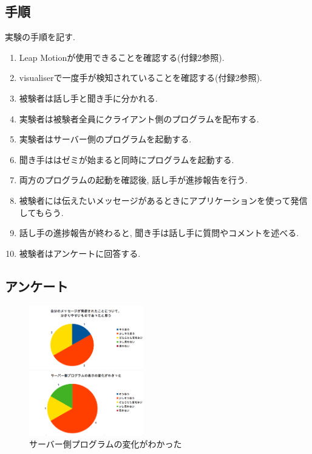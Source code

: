 \documentclass{funthesis}
\begin{document}
\subsection{手順}
実験の手順を記す. 

\begin{enumerate}
 \item Leap Motionが使用できることを確認する(付録2参照).
 \item visualiserで一度手が検知されていることを確認する(付録2参照).
 \item 被験者は話し手と聞き手に分かれる. 
 \item 実験者は被験者全員にクライアント側のプログラムを配布する.
 \item 実験者はサーバー側のプログラムを起動する. 
 \item 聞き手ははゼミが始まると同時にプログラムを起動する. 
 \item 両方のプログラムの起動を確認後, 話し手が進捗報告を行う. 
 \item 被験者には伝えたいメッセージがあるときにアプリケーションを使って発信してもらう.
 \item 話し手の進捗報告が終わると, 聞き手は話し手に質問やコメントを述べる.
 \item 被験者はアンケートに回答する.
\end{enumerate}

\subsection{アンケート}

\begin{figure}[H]
 \begin{minipage}{0.5\hsize}
  \begin{center}
  \includegraphics[width=50mm]{./img/question1.png}
  \end{center}
  \caption{自分の発信メッセージされたこと\newline についてわかりやすかったと思う}
  \label{question1}
 \end{minipage}
 \begin{minipage}{0.5\hsize}
  \begin{center}
  \includegraphics[width=50mm]{./img/question2.png}
  \end{center}
  \caption{サーバー側プログラムの変化\newline がわかった}
  \label{question2}
  \end{minipage}
  \end{figure}
\end{document}
